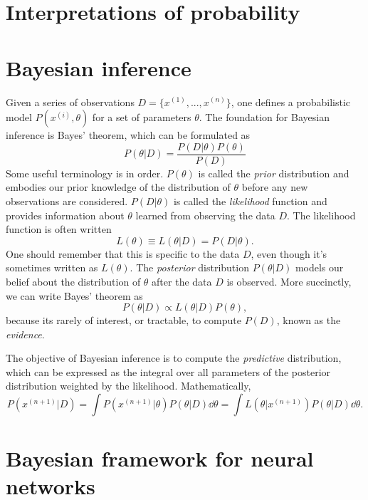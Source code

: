 \section{Interpretations of probability}


\section{Bayesian inference}
Given a series of observations $D = \{ x^{(1)}, ... , x^{(n)} \}$, one defines a probabilistic model $P(x^{(i)}, \theta)$ for a set of parameters $\theta$.  The foundation for Bayesian inference is Bayes' theorem, which can be formulated as
\begin{equation}
	P(\theta | D) = \frac{P(D|\theta)P(\theta)}{P(D)}
\end{equation}
Some useful terminology is in order. $P(\theta)$ is called the \textit{prior} distribution and embodies our prior knowledge of the distribution of $\theta$ before any new observations are considered. $P(D|\theta)$ is called the \textit{likelihood} function and provides information about $\theta$ learned from observing the data $D$. The likelihood function is often written
\begin{equation}
  L(\theta) \equiv L(\theta|D) = P(D|\theta).
\end{equation}
One should remember that this is specific to the data $D$, even though it's sometimes written as $L(\theta)$. The \textit{posterior} distribution $P(\theta|D)$ models our belief about the distribution of $\theta$ after the data $D$ is observed. More succinctly, we can write Bayes' theorem as
\begin{equation}
  P(\theta|D) \propto L(\theta|D)P(\theta),
\end{equation}
because its rarely of interest, or tractable, to compute $P(D)$, known as the \textit{evidence}.

The objective of Bayesian inference is to compute the \textit{predictive} distribution, which can be expressed as
the integral over all parameters of the posterior distribution weighted by the likelihood. Mathematically,
\begin{equation}
  P(x^{(n+1)}|D) = \int P(x^{(n+1)}|\theta)P(\theta|D)\dd \theta = \int L(\theta|x^{(n+1)})P(\theta|D)\dd \theta.
\end{equation}


\section{Bayesian framework for neural networks}

